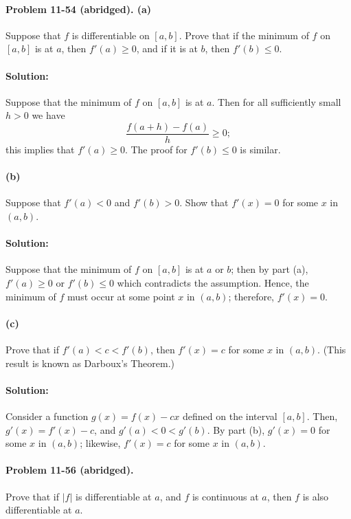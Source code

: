 \documentclass{article}
\begin{document}
\paragraph{Problem 11-54 (abridged). (a)} Suppose that $f$ is differentiable on
$[a, b]$. Prove that if the minimum of $f$ on $[a, b]$ is at $a$, then $f'(a)
\geq 0$, and if it is at $b$, then $f'(b) \leq 0$.

\paragraph{Solution:} Suppose that the minimum of $f$ on $[a, b]$ is at $a$.
Then for all sufficiently small $h > 0$ we have \begin{equation*}
  \frac{f(a + h) - f(a)}{h} \geq 0;
\end{equation*} this implies that $f'(a) \geq 0$. The proof for $f'(b) \leq 0$
is similar.

\paragraph{(b)} Suppose that $f'(a) < 0$ and $f'(b) > 0$. Show that $f'(x) = 0$
for some $x$ in $(a, b)$.

\paragraph{Solution:} Suppose that the minimum of $f$ on $[a, b]$ is at $a$ or
$b$; then by part (a), $f'(a) \geq 0$ or $f'(b) \leq 0$ which contradicts the
assumption. Hence, the minimum of $f$ must occur at some point $x$ in $(a, b)$;
therefore, $f'(x) = 0$.

\paragraph{(c)} Prove that if $f'(a) < c < f'(b)$, then $f'(x) = c$ for some
$x$ in $(a, b)$. (This result is known as Darboux's Theorem.)

\paragraph{Solution:} Consider a function $g(x) = f(x) - cx$ defined on the
interval $[a, b]$. Then, $g'(x) = f'(x) - c$, and $g'(a) < 0 < g'(b)$. By part
(b), $g'(x) = 0$ for some $x$ in $(a, b)$; likewise, $f'(x) = c$ for some $x$
in $(a, b)$.

\paragraph{Problem 11-56 (abridged).} Prove that if $|f|$ is differentiable at
$a$, and $f$ is continuous at $a$, then $f$ is also differentiable at $a$.
\end{document}
